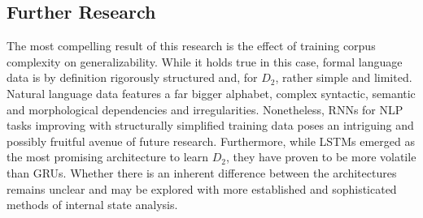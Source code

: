 \subsection{Further Research}
The most compelling result of this research is the effect of training corpus complexity on generalizability. While it holds true in this case, formal language data is by definition rigorously structured and, for $D_{2}$, rather simple and limited. Natural language data features a far bigger alphabet, complex syntactic, semantic and morphological dependencies and irregularities. Nonetheless, RNNs for NLP tasks improving with structurally simplified training data poses an intriguing and possibly fruitful avenue of future research.
Furthermore, while LSTMs emerged as the most promising architecture to learn $D_{2}$, they have proven to be more volatile than GRUs. Whether there is an inherent difference between the architectures remains unclear and may be explored with more established and sophisticated methods of internal state analysis.